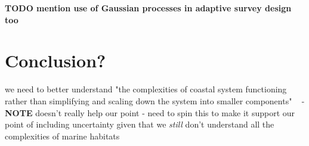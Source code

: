 \documentclass[12pt]{article}
\begin{document}
            \textbf{TODO mention use of Gaussian processes in adaptive survey design too}

            \section{Conclusion?}
            we need to better understand "the complexities of coastal system functioning rather than simplifying and scaling down the system into smaller components" ~\citep*{diaz04} - \textbf{NOTE} doesn't really help our point - need to spin this to make it support our point of including uncertainty given that we \textit{still} don't understand all the complexities of marine habitats

\newpage



\end{document}
